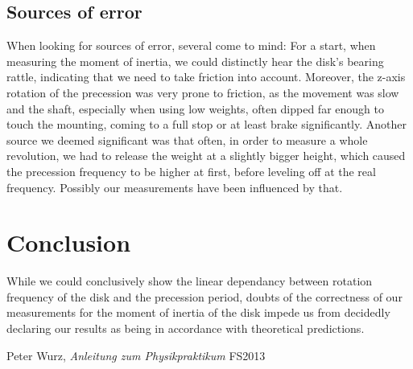 \documentclass{scrreprt}
\begin{document}
\subsection{Sources of error}
\label{sec:error}
When looking for sources of error, several come to mind: For a start, when measuring the moment of inertia, we could distinctly hear the disk's bearing rattle, indicating that we need to take friction into account. Moreover, the z-axis rotation of the precession was very prone to friction, as the movement was slow and the shaft, especially when using low weights, often dipped far enough to touch the mounting, coming to a full stop or at least brake significantly. Another source we deemed significant was that often, in order to measure a whole revolution, we had to release the weight at a slightly bigger height, which caused the precession frequency to be higher at first, before leveling off at the real frequency. Possibly our measurements have been influenced by that.

\section{Conclusion}
While we could conclusively show the linear dependancy between rotation frequency of the disk and the precession period, doubts of the correctness of our measurements for the moment of inertia of the disk impede us from decidedly declaring our results as being in accordance with theoretical predictions.

\begin{thebibliography}{9}

  Peter Wurz,
  \emph{Anleitung zum Physikpraktikum}
  FS2013

\end{thebibliography}
\end{document}
